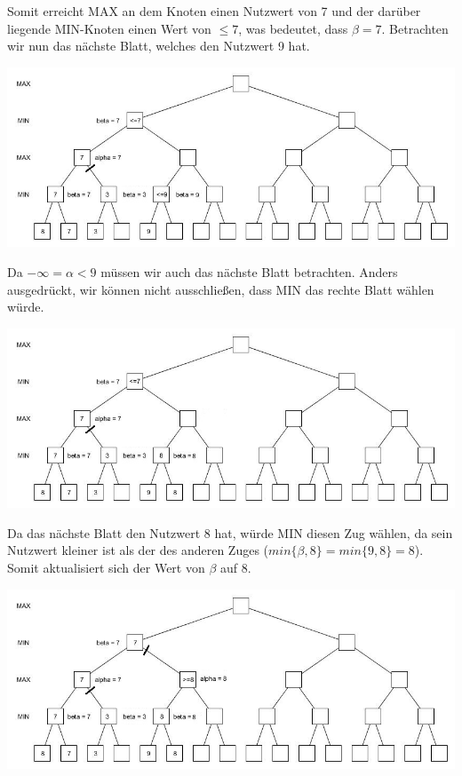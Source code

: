 Somit erreicht MAX an dem Knoten einen Nutzwert von 7 und der darüber liegende MIN-Knoten einen Wert von $\le7$, was bedeutet, dass $\beta = 7$. Betrachten wir nun das nächste Blatt, welches den Nutzwert 9 hat.

\begin{center}
	\includegraphics[width = 12 cm]{chapters/minimax/jpg/Alpha-beta4.jpg}
\end{center}

 Da $-\infty = \alpha <9$ müssen wir auch das nächste Blatt betrachten. Anders ausgedrückt, wir können nicht ausschließen, dass MIN das rechte Blatt wählen würde.

 \begin{center}
 	\includegraphics[width = 12 cm]{chapters/minimax/jpg/Alpha-beta5.jpg}
 \end{center}

 Da das nächste Blatt den Nutzwert 8 hat, würde MIN diesen Zug wählen, da sein Nutzwert kleiner ist als der des anderen Zuges ($min\{\beta, 8\}= min\{9,8\}=8$). Somit aktualisiert sich der Wert von $\beta$ auf 8.

 \begin{center}
 	\includegraphics[width = 12 cm]{chapters/minimax/jpg/Alpha-beta6.jpg}
 \end{center}

